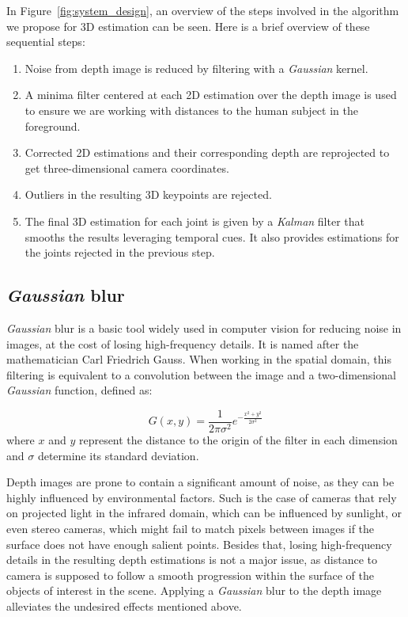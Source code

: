 In Figure~\ref{fig:system_design}, an overview of the steps involved in the algorithm we propose for 3D estimation can be seen. Here is a brief overview of these sequential steps:
\begin{enumerate}
    \item Noise from depth image is reduced by filtering with a \emph{Gaussian} kernel.
    \item A minima filter centered at each 2D estimation over the depth image is used to ensure we are working with distances to the human subject in the foreground.
    \item Corrected 2D estimations and their corresponding depth are reprojected to get three-dimensional camera coordinates.
    \item Outliers in the resulting 3D keypoints are rejected.
    \item The final 3D estimation for each joint is given by a \emph{Kalman} filter that smooths the results leveraging temporal cues. It also provides estimations for the joints rejected in the previous step.
\end{enumerate}

\subsection{\emph{Gaussian} blur}\label{subsec:gaussian_filter}
\emph{Gaussian} blur is a basic tool widely used in computer vision for reducing noise in images, at the cost of losing high-frequency details. It is named after the mathematician Carl Friedrich Gauss. When working in the spatial domain, this filtering is equivalent to a convolution between the image and a two-dimensional \emph{Gaussian} function, defined as:

\begin{equation}
    G(x, y) = \frac{1}{2\pi\sigma^2}e^{-\frac{x^2 + y^2}{2\sigma^2}}
\end{equation}\label{eq:gaussian_blur}
where \(x\) and \(y\) represent the distance to the origin of the filter in each dimension and \(\sigma\) determine its standard deviation. 

Depth images are prone to contain a significant amount of noise, as they can be highly influenced by environmental factors. Such is the case of cameras that rely on projected light in the infrared domain, which can be influenced by sunlight, or even stereo cameras, which might fail to match pixels between images if the surface does not have enough salient points. Besides that, losing high-frequency details in the resulting depth estimations is not a major issue, as distance to camera is supposed to follow a smooth progression within the surface of the objects of interest in the scene. Applying a \textit{Gaussian} blur to the depth image alleviates the undesired effects mentioned above. 


